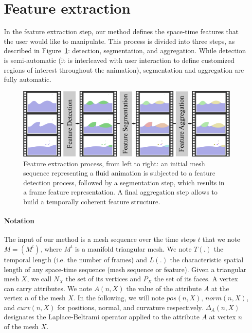 \section{Feature extraction}
\label{sec:extraction}
 In the feature extraction step, our method defines the space-time features that the user would like to manipulate. 
This process is divided into three steps, as described in Figure~\ref{fig:feature_extraction}: detection, segmentation, and aggregation. 
While detection is semi-automatic (it is interleaved with user interaction to define customized regions of interest throughout the animation), segmentation and aggregation are fully automatic.
 \begin{figure}[!h]
 	\centering
 	\includegraphics[width=\linewidth]{images/fluidsculpting-mig2016/feature_extraction_2.png}
 	\caption[Fluid sculpting: Feature extraction]{Feature extraction process, from left to right: an initial mesh sequence representing a fluid animation is subjected to a feature detection process, followed by a segmentation step, which results in a frame feature representation. 
 		A final aggregation step allows to build a temporally coherent feature structure.}
 	\label{fig:feature_extraction}
 \end{figure}

\paragraph{Notation}
The input of our method is a mesh sequence over the time steps $t$ that we note $M = (M^t)$, where $M^t$ is a manifold triangular mesh.
We note $T(.)$ the temporal length (i.e. the number of frames) and $L(.)$ the characteristic spatial length of any space-time sequence (mesh sequence or feature).
Given a triangular mesh $X$, we call $N_X$ the set of its vertices and $P_X$ the set of its faces.
A vertex can carry attributes. We note $A(n,X)$ the value of the attribute $A$ at the vertex $n$ of the mesh $X$. In the following, we will note $pos(n,X)$, $norm(n,X)$, and $curv(n,X)$ for positions, normal, and curvature respectively.
$\Delta_{A}(n,X)$ designates the Laplace-Beltrami operator applied to the attribute $A$ at vertex $n$ of the mesh $X$.

